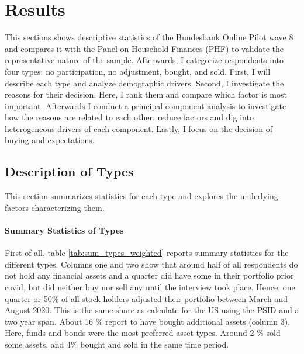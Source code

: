 \documentclass[ProjectABM]{subfiles}
\begin{document}



\section{Results}\label{sec:results}
This sections shows descriptive statistics of the Bundesbank Online Pilot wave 8 and compares it with the Panel on Household Finances (PHF) to validate the representative nature of the sample. Afterwards, I categorize respondents into four types: no participation, no adjustment, bought, and sold. First, I will describe each type and analyze demographic drivers. Second, I investigate the reasons for their decision. Here, I rank them and compare which factor is most important. Afterwards I conduct a principal component analysis to investigate how the reasons are related to each other, reduce factors and dig into heterogeneous drivers of each component. Lastly, I focus on the decision of buying and expectations. 

\subsection{Description of Types}\label{sec:des_types}
This section summarizes statistics for each type and explores the underlying factors characterizing them.

\paragraph{Summary Statistics of Types}
First of all, table \ref{tab:sum_types_weighted} reports summary statistics for the different types. Columns one and two show that around half of all respondents do not hold any financial assets and a quarter did have some in their portfolio prior covid, but did neither buy nor sell any until the interview took place. Hence, one quarter or 50\% of all stock holders adjusted their portfolio between March and August 2020. This is the same share as \cite{bonaparte_et_al_2012adjustment} calculate for the US using the PSID and a two year span. %
About 16 \% report to have bought additional assets (column 3). Here, funds and bonds were the most preferred asset types. Around 2 \% sold some assets, and 4\% bought and sold in the same time period. 
\end{document}
